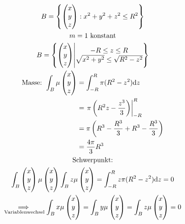 \begin{bsp*}[note = Kugel]
	\begin{gather*}
		B = \left\{ \begin{pmatrix} x \\ y \\ z \end{pmatrix} : x^2 + y^2 + z^2 \leq R^2 \right\} \\
		m = 1 \text{ konstant} \\
		B = \left\{ \begin{pmatrix} x \\ y \\ z \end{pmatrix} \middle| \begin{matrix} -R \leq z \leq R \\ \sqrt{x^2 + y^2} \leq \sqrt{R^2 - z^2} \end{matrix} \right\} \\
		\begin{split}
			\text{Masse: } \int_B \mu\begin{pmatrix} x \\ y \\ z \end{pmatrix}
				&= \int_{-R}^R \pi (R^2 - z^2) \dd z \\
				&= \left. \pi \left( R^2 z - \frac{z^3}{3} \right)\right|_{-R}^R \\
				&= \pi \left( R^3 - \frac{R^3}{3} + R^3 - \frac{R^3}{3} \right) \\
				&= \frac{4\pi}{3} R^3
		\end{split} \\
		\text{Schwerpunkt:} \\
		\int_B \begin{pmatrix} x \\ y \\ z \end{pmatrix} \mu\begin{pmatrix} x \\ y \\ z \end{pmatrix}
		\int_B z \mu\begin{pmatrix} x \\ y \\ z \end{pmatrix} = \int_{-R}^R z \pi (R^2 - z^2) \dd z = 0 \\
		\underset{\text{\scriptsize{Variablenwechsel}}}{\implies} \int_B x \mu\begin{pmatrix} x \\ y \\ z \end{pmatrix} = \int_B y \mu\begin{pmatrix} x \\ y \\ z \end{pmatrix} = \int_B z \mu\begin{pmatrix} x \\ y \\ z \end{pmatrix} = 0 \\

\end{gather*}
\end{bsp*}

